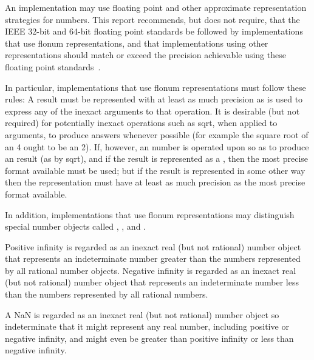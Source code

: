 \vest An implementation may use floating point and other approximate 
representation strategies for  numbers.
%
%
This report recommends, but does not require, that the IEEE 32-bit
and 64-bit floating point standards be followed by implementations that use
flonum representations, and that implementations using
other representations should match or exceed the precision achievable
using these floating point standards~\cite{IEEE}.

\vest In particular, implementations that use flonum representations
must follow these rules: A  result
must be represented with at least as much precision as is used to express any of
the inexact arguments to that operation.  It is desirable (but not required) for
potentially inexact operations such as {\cf sqrt}, when applied to 
arguments, to produce  answers whenever possible (for example the
square root of an  4 ought to be an  2).
If, however, an
 number is operated upon so as to produce an  result
(as by {\cf sqrt}), and if the result is represented as a , then
the most precise  format available must be used; but if the result
is represented in some other way then the representation must have at least as
much precision as the most precise  format available.

In addition, implementations that use flonum representations may
distinguish special number objects called ,
, and .

Positive infinity is regarded as an inexact real (but not rational)
number object that represents an indeterminate number greater than the
numbers represented by all rational number objects. Negative infinity
is regarded as an inexact real (but not rational) number object that
represents an indeterminate number less than the numbers represented
by all rational numbers.

A NaN is regarded as an inexact real (but not rational) number object
so indeterminate that it might represent any real number, including
positive or negative infinity, and might even be greater than positive
infinity or less than negative infinity.


